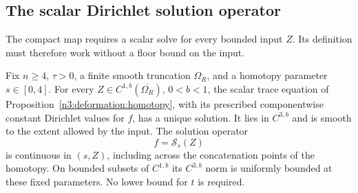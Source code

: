 \subsection{The scalar Dirichlet solution operator}

The compact map requires a scalar solve for every bounded input $Z$.
Its definition must therefore work without a floor bound on the input.

\begin{lemma}
\label{n3:existence:scalar-solve}
Fix $n\ge4$, $\tau>0$, a finite smooth truncation $\Omega_R$,
and a homotopy parameter $s\in[0,4]$.  For every
$Z\in C^{1,b}(\overline{\Omega_R})$, $0<b<1$, the scalar trace
equation of Proposition~\ref{n3:deformation:homotopy}, with its
prescribed componentwise constant Dirichlet values for $f$, has a
unique solution.  It lies in $C^{3,b}$ and is smooth to the extent
allowed by the input.  The solution operator
\begin{equation}\label{n3:existence:scalar-operator}
 f=\mathcal S_s(Z)
\end{equation}
is continuous in $(s,Z)$, including across the concatenation points
of the homotopy.  On bounded subsets of $C^{1,b}$ its $C^{3,b}$
norm is uniformly bounded at these fixed parameters.  No lower
bound for $t$ is required.
\end{lemma}


